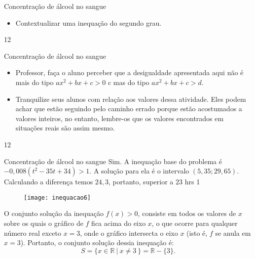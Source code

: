 \clearpage
\def\currentcolor{session2}
\begin{objectives}{Concentração de álcool no sangue}
{
\begin{itemize}
\item Contextualizar uma inequação do segundo grau.
\end{itemize}
}{1}{2}
\end{objectives}
\begin{sugestions}{Concentração de álcool no sangue}
{
\begin{itemize}
\item Professor, faça o aluno perceber que a desigualdade apresentada aqui não é mais do tipo $ax^2+bx+c>0$ c mas do tipo $ax^2+bx+c>d$.
\item Tranquilize seus alunos com relação aos valores dessa atividade. Eles podem achar que estão seguindo pelo caminho errado porque estão acostumados a valores inteiros, no entanto, lembre-os que os valores encontrados em situações reais são assim mesmo.  
\end{itemize}
}{1}{2}
\end{sugestions}
\begin{answer}{Concentração de álcool no sangue}
{
Sim. A inequação base do problema é $-0{,}008(t^2-35t + 34)>1.$ A solução para ela é o intervalo $(5{,}35;29{,}65)$. Calculando a diferença temos $24{,}3$, portanto, superior a $23$ hrs
}{1}
\end{answer}
\begin{figure}[H]
\centering
\noindent\texttt{[image: inequacao6]}
\end{figure}
O conjunto solução da inequação $f(x) > 0$, consiste em todos os valores de $x$ sobre os quais o gráfico de $f$ fica acima do eixo $x$, o que ocorre para qualquer número real exceto $x = 3$, onde o gráfico intersecta o eixo $x$ (isto é, $f$ se anula em $x = 3$). Portanto, o conjunto solução dessia inequação é:
$$
S = \{x \in \mathbb{R} \ | \ x \neq 3\ \} = \mathbb{R} - \{3\}.
$$

\label{\detokenize{AF107-8:inequacoes-grau2}}\label{\detokenize{AF107-8::doc}}

